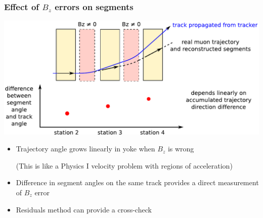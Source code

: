 \documentclass[compress]{beamer}
\begin{document}
\begin{frame}
\frametitle{Effect of $B_z$ errors on segments}

\vfill
\includegraphics[width=\linewidth]{paths2.pdf}

\vfill
\begin{itemize}
\item Trajectory angle grows linearly in yoke when $B_z$ is wrong

{\scriptsize (This is like a Physics I velocity problem with regions of acceleration)}

\item Difference in segment angles on the same track provides a direct measurement of $B_z$ error
\item Residuals method can provide a cross-check
\end{itemize}
\end{frame}
\end{document}
